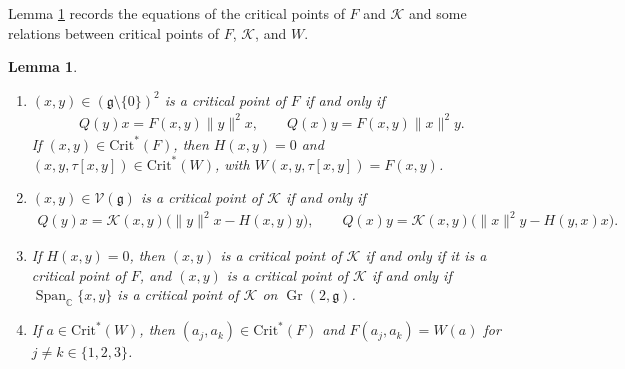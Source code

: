 \documentclass [leqno, 10pt]{amsart}
\newtheorem{lemma}[theorem]{Lemma}%
\theoremstyle{definition}
\numberwithin{equation}{section}
\newcommand{\grass}{\operatorname{Gr}}
\newcommand{\sect}{\mathscr{K}}
\newcommand{\spn}{\operatorname{Span}}
\newcommand{\g}{\mathfrak{g}}
\newcommand{\stiefel}{\mathscr{V}}
\newcommand{\com}{\mathbb C}
\newcommand{\crtnt}{\mathrm{Crit}^*}
\newcommand{\norm}[1]{\lVert #1\rVert}
\newcommand{\qad}{Q}
\begin{document}
Lemma \ref{lem:critFK} records the equations of the critical points of $F$ and $\sect$ and some relations between critical points of $F$, $\sect$, and $W$.
\begin{lemma}\label{lem:critFK}
\leavevmode\noindent
\begin{enumerate}[label=(\arabic*), ref=(\arabic*)]
\item\label{critF} $(x, y) \in (\g \setminus \{0\})^{2}$ is a critical point of $F$ if and only if 
\begin{align}\label{eq:F}
\qad(y)x = F(x,y)\norm{y}^2 x, \qquad \qad(x)y = F(x,y)\norm{x}^2 y .
\end{align}
If $(x,y)\in\crtnt(F)$, then $H(x, y) = 0$ and $(x,y,\tau[x,y])\in\crtnt(W)$, with $W(x,y,\tau[x,y])=F(x,y)$.
\item\label{critK} $(x, y) \in \stiefel(\g)$ is a critical point of $\sect$ if and only if
\begin{align}\label{eq:K}
\qad(y)x = \sect(x, y)\big(\norm{y}^{2}x - H(x, y)y\big), \qquad \qad(x)y = \sect(x, y)\big(\norm{x}^{2}y - H(y, x)x\big).
\end{align}
\item\label{corr3} If $H(x, y) = 0$, then $(x, y)$ is a critical point of $\sect$ if and only if it is a critical point of $F$, and $(x, y)$ is a critical point of $\sect$ if and only if $\spn_{\com}\{x, y\}$ is a critical point of $\sect$ on $\grass(2, \g)$.
\item\label{corr2} If $a \in\crtnt(W)$, then $(a_{j}, a_{k})\in\crtnt(F)$ and $F(a_{j}, a_{k}) = W(a)$ for $j \neq k \in \{1, 2, 3\}$.
\end{enumerate}
\end{lemma}
\end{document}

